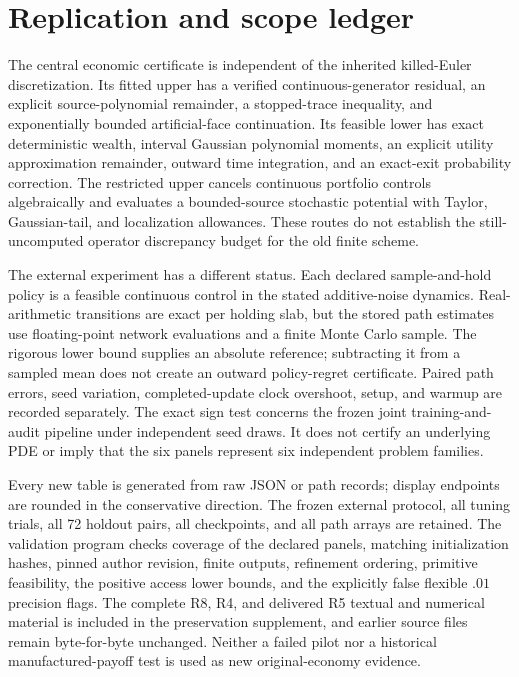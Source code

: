 \section{Replication and scope ledger}\label{r9:proof:ledger}
The central economic certificate is independent of the inherited killed-Euler discretization. Its fitted upper has a verified continuous-generator residual, an explicit source-polynomial remainder, a stopped-trace inequality, and exponentially bounded artificial-face continuation. Its feasible lower has exact deterministic wealth, interval Gaussian polynomial moments, an explicit utility approximation remainder, outward time integration, and an exact-exit probability correction. The restricted upper cancels continuous portfolio controls algebraically and evaluates a bounded-source stochastic potential with Taylor, Gaussian-tail, and localization allowances. These routes do not establish the still-uncomputed operator discrepancy budget for the old finite scheme.

The external experiment has a different status. Each declared sample-and-hold policy is a feasible continuous control in the stated additive-noise dynamics. Real-arithmetic transitions are exact per holding slab, but the stored path estimates use floating-point network evaluations and a finite Monte Carlo sample. The rigorous lower bound supplies an absolute reference; subtracting it from a sampled mean does not create an outward policy-regret certificate. Paired path errors, seed variation, completed-update clock overshoot, setup, and warmup are recorded separately. The exact sign test concerns the frozen joint training-and-audit pipeline under independent seed draws. It does not certify an underlying PDE or imply that the six panels represent six independent problem families.

Every new table is generated from raw JSON or path records; display endpoints are rounded in the conservative direction. The frozen external protocol, all tuning trials, all 72 holdout pairs, all checkpoints, and all path arrays are retained. The validation program checks coverage of the declared panels, matching initialization hashes, pinned author revision, finite outputs, refinement ordering, primitive feasibility, the positive access lower bounds, and the explicitly false flexible $.01$ precision flags. The complete R8, R4, and delivered R5 textual and numerical material is included in the preservation supplement, and earlier source files remain byte-for-byte unchanged. Neither a failed pilot nor a historical manufactured-payoff test is used as new original-economy evidence.
